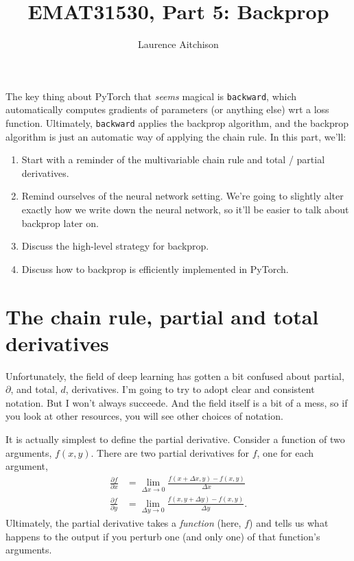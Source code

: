\documentclass{article}
\title{EMAT31530, Part 5: Backprop}
\author{Laurence Aitchison}
\date{}
\newcommand{\dd}[2][]{\frac{\partial #1}{\partial #2}}
\begin{document}
\maketitle

The key thing about PyTorch that \textit{seems} magical is \verb|backward|, which automatically computes gradients of parameters (or anything else) wrt a loss function.
Ultimately, \verb|backward| applies the backprop algorithm, and the backprop algorithm is just an automatic way of applying the chain rule.  
In this part, we'll:
\begin{enumerate}
  \item Start with a reminder of the multivariable chain rule and total / partial derivatives.
  \item Remind ourselves of the neural network setting. We're going to slightly alter exactly how we write down the neural network, so it'll be easier to talk about backprop later on.
  \item Discuss the high-level strategy for backprop.
  \item Discuss how to backprop is efficiently implemented in PyTorch.
\end{enumerate}

\section{The chain rule, partial and total derivatives}

Unfortunately, the field of deep learning has gotten a bit confused about partial, $\partial$, and total, $d$, derivatives.
I'm going to try to adopt clear and consistent notation.
But I won't always succeede.  
And the field itself is a bit of a mess, so if you look at other resources, you will see other choices of notation.

It is actually simplest to define the partial derivative.  Consider a function of two arguments, $f(x, y)$.
There are two partial derivatives for $f$, one for each argument,
\begin{subequations}
\begin{align}
  \label{eq:ddfx}
  \dd[f]{x} &= \lim_{\Delta x \rightarrow 0} \frac{f(x + \Delta x, y) - f(x, y)}{\Delta x}\\
  \label{eq:ddfy}
  \dd[f]{y} &= \lim_{\Delta y \rightarrow 0} \frac{f(x, y + \Delta y) - f(x, y)}{\Delta y}.
\end{align}
\end{subequations}
Ultimately, the partial derivative takes a \textit{function} (here, $f$) and tells us what happens to the output if you perturb one (and only one) of that function's arguments.
\end{document}
